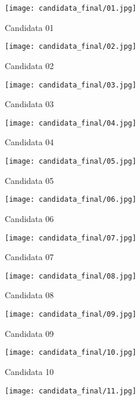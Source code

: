 \begin{figure}[!ht]
    \centering
    \captionsetup{justification=centering}
    \begin{subfigure}[b]{0.25\textwidth}
        \texttt{[image: candidata\_final/01.jpg]}
        \caption{Candidata 01}
    \end{subfigure}
    \begin{subfigure}[b]{0.25\textwidth}
        \texttt{[image: candidata\_final/02.jpg]}
        \caption{Candidata 02}
    \end{subfigure}
    \begin{subfigure}[b]{0.25\textwidth}
        \texttt{[image: candidata\_final/03.jpg]}
        \caption{Candidata 03}
    \end{subfigure}
    \begin{subfigure}[b]{0.25\textwidth}
        \texttt{[image: candidata\_final/04.jpg]}
        \caption{Candidata 04}
    \end{subfigure}
    \begin{subfigure}[b]{0.25\textwidth}
        \texttt{[image: candidata\_final/05.jpg]}
        \caption{Candidata 05}
    \end{subfigure}
    \begin{subfigure}[b]{0.25\textwidth}
        \texttt{[image: candidata\_final/06.jpg]}
        \caption{Candidata 06}
    \end{subfigure}
    \begin{subfigure}[b]{0.25\textwidth}
        \texttt{[image: candidata\_final/07.jpg]}
        \caption{Candidata 07}
    \end{subfigure}
    \begin{subfigure}[b]{0.25\textwidth}
        \texttt{[image: candidata\_final/08.jpg]}
        \caption{Candidata 08}
    \end{subfigure}
    \begin{subfigure}[b]{0.25\textwidth}
        \texttt{[image: candidata\_final/09.jpg]}
        \caption{Candidata 09}
    \end{subfigure}
    \begin{subfigure}[b]{0.25\textwidth}
        \texttt{[image: candidata\_final/10.jpg]}
        \caption{Candidata 10}
    \end{subfigure}
    \begin{subfigure}[b]{0.25\textwidth}
        \texttt{[image: candidata\_final/11.jpg]}

\end{subfigure}
\end{figure}
